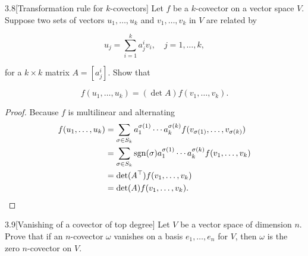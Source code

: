 \begin{problem}{3.8}[Transformation rule for \( k \)-covectors]
Let \( f \) be a \( k \)-covector on a vector space \( V \). Suppose two sets of vectors \( u_{1}, \ldots, u_{k} \) and \( v_{1}, \ldots, v_{k} \) in \( V \) are related by

\[
    u_{j} = \sum_{i=1}^{k} a_{j}^{i} v_{i}, \quad j = 1, \ldots, k,
\]

for a \( k \times k \) matrix \( A = [a_{j}^{i}] \). Show that

\[
    f(u_{1}, \ldots, u_{k}) = (\det A) f(v_{1}, \ldots, v_{k}).
\]
\end{problem}

\begin{proof}
    Because \( f \) is multilinear and alternating
    \begingroup
    \allowdisplaybreaks%
    \begin{align*}
        f(u_{1}, \ldots, u_{k}) & = \sum_{\sigma \in S_{k}} a^{\sigma(1)}_{1}\cdots a^{\sigma(k)}_{k} f(v_{\sigma(1)}, \ldots, v_{\sigma(k)})           \\
                                & = \sum_{\sigma \in S_{k}} \operatorname{sgn}(\sigma)a^{\sigma(1)}_{1}\cdots a^{\sigma(k)}_{k} f(v_{1}, \ldots, v_{k}) \\
                                & = \det(A^{\top}) f(v_{1}, \ldots, v_{k})                                                                              \\
                                & = \det(A) f(v_{1}, \ldots, v_{k}). \qedhere
    \end{align*}
    \endgroup
\end{proof}

\begin{problem}{3.9}[Vanishing of a covector of top degree]\label{problem:3.9}
Let \( V \) be a vector space of dimension \( n \). Prove that if an \( n \)-covector \( \omega \) vanishes on a basis \( e_{1}, \ldots, e_{n} \) for \( V \), then \( \omega \) is the zero \( n \)-covector on \( V \).
\end{problem}

